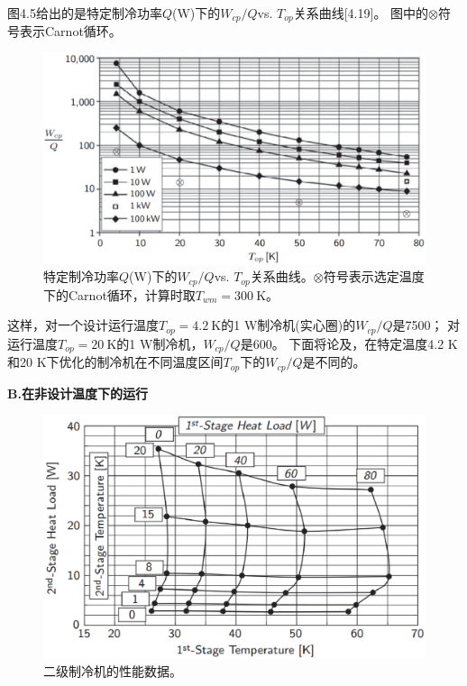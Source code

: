 图4.5给出的是特定制冷功率$Q$($\mathrm{W}$)下的$W_{cp}/Q$vs. $T_{op}$关系曲线[4.19]。
图中的$\otimes$符号表示Carnot循环。
\begin{figure}[htbp]
	\centering
	\includegraphics[scale=0.4]{chpt4/figs/fig4.5.eps}
	\caption{特定制冷功率$Q$($\mathrm{W}$)下的$W_{cp}/Q$vs. $T_{op}$关系曲线。$\otimes$符号表示选定温度下的Carnot循环，计算时取$T_{wm}=300\ \mathrm{K}$。}
\end{figure}

这样，对一个设计运行温度$T_{op}=4.2\ \mathrm{K}$的1 W制冷机(实心圈)的$W_{cp}/Q$是7500；
对运行温度$T_{op}=20\ \mathrm{K}$的1 W制冷机，$W_{cp}/Q$是600。
下面将论及，在特定温度4.2 K和20 K下优化的制冷机在不同温度区间$T_{op}$下的$W_{cp}/Q$是不同的。

\textbf{B.在非设计温度下的运行}

\begin{figure}[htbp]
	\centering
	\includegraphics[scale=0.5]{chpt4/figs/fig4.6.eps}
	\caption{二级制冷机的性能数据。}
\end{figure}

